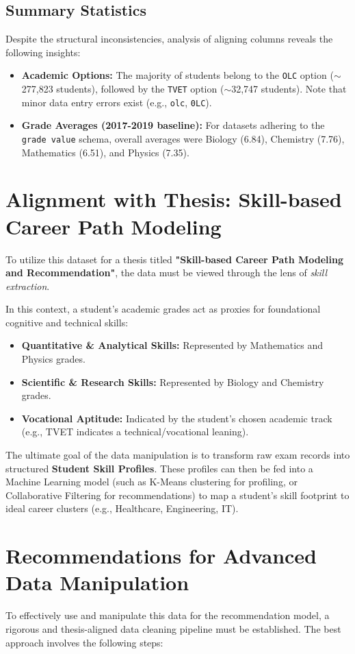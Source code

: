 \documentclass{article}
\begin{document}
\subsection{Summary Statistics}
Despite the structural inconsistencies, analysis of aligning columns reveals the following insights:
\begin{itemize}
    \item \textbf{Academic Options:} The majority of students belong to the \texttt{OLC} option ($\sim$277,823 students), followed by the \texttt{TVET} option ($\sim$32,747 students). Note that minor data entry errors exist (e.g., \texttt{olc}, \texttt{0LC}).
    \item \textbf{Grade Averages (2017-2019 baseline):} For datasets adhering to the \texttt{grade value} schema, overall averages were Biology (6.84), Chemistry (7.76), Mathematics (6.51), and Physics (7.35).
\end{itemize}

\section{Alignment with Thesis: Skill-based Career Path Modeling}
To utilize this dataset for a thesis titled \textbf{"Skill-based Career Path Modeling and Recommendation"}, the data must be viewed through the lens of \textit{skill extraction}. 

In this context, a student's academic grades act as proxies for foundational cognitive and technical skills:
\begin{itemize}
    \item \textbf{Quantitative \& Analytical Skills:} Represented by Mathematics and Physics grades.
    \item \textbf{Scientific \& Research Skills:} Represented by Biology and Chemistry grades.
    \item \textbf{Vocational Aptitude:} Indicated by the student's chosen academic track (e.g., TVET indicates a technical/vocational leaning).
\end{itemize}

The ultimate goal of the data manipulation is to transform raw exam records into structured \textbf{Student Skill Profiles}. These profiles can then be fed into a Machine Learning model (such as K-Means clustering for profiling, or Collaborative Filtering for recommendations) to map a student's skill footprint to ideal career clusters (e.g., Healthcare, Engineering, IT).

\section{Recommendations for Advanced Data Manipulation}
To effectively use and manipulate this data for the recommendation model, a rigorous and thesis-aligned data cleaning pipeline must be established. The best approach involves the following steps:
\end{document}
